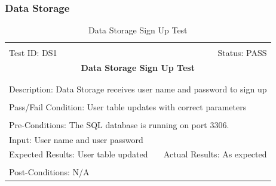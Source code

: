 \documentclass[11pt]{article}
\begin{document}
\subsubsection{Data Storage} %
\begin{center}
\begin{table}[H]
\begin{tabular}{|l r|}\hline&\\[-2mm]
	Test ID: DS1	&Status: PASS\\[-3mm]
	\multicolumn{2}{|c|}{\textbf{\large{Data Storage Sign Up Test}}}\\&\\\hline&\\[-3mm]
	\multicolumn{2}{|p{\textwidth}|}{Description: Data Storage receives user name and password to sign up}\\[1mm]\hline&\\[-3mm]
	\multicolumn{2}{|p{\textwidth}|}{Pass/Fail Condition: User table updates with correct parameters}\\[1mm]\hline&\\[-3mm]
	\multicolumn{2}{|p{\textwidth}|}{Pre-Conditions: The SQL database is running on port 3306.}\\[4mm]
	\multicolumn{2}{|p{\textwidth}|}{Input: User name and user password}\\[2mm]\hline
	\multicolumn{1}{|p{0.49\textwidth}}{Expected Results: User table updated}	&\multicolumn{1}{|p{0.45\textwidth}|}{Actual Results: As expected}\\\hline&\\[-3mm]
	\multicolumn{2}{|p{\textwidth}|}{Post-Conditions: N/A}\\\hline
\end{tabular}
\caption{Data Storage Sign Up Test}
\end{table}
\end{center}
\end{document}
